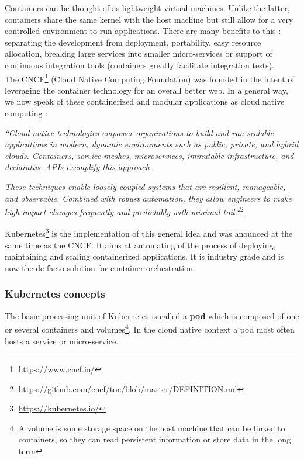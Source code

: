 \documentclass[12pt, a4paper]{memoir}
\begin{document}
Containers can be thought of as lightweight virtual machines. Unlike the
latter, containers share the same kernel with the host machine but still allow
for a very controlled environment to run applications. There are many
benefits to this : separating the development from deployment, portability,
easy resource allocation, breaking large services into smaller micro-services
or support of continuous integration tools (containers greatly facilitate
integration tests).\\

The CNCF\footnote{\url{https://www.cncf.io/}} (Cloud Native Computing
Foundation) was founded in the intent of leveraging the container technology
for an overall better web. In a general way, we now speak of these
containerized and modular applications as cloud native computing :

\textit{``Cloud native technologies empower organizations to build and run
	scalable applications in modern, dynamic environments such as public,
	private, and hybrid clouds. Containers, service meshes, microservices,
	immutable infrastructure, and declarative APIs exemplify this
	approach.}

\textit{These techniques enable loosely coupled systems that
	are resilient, manageable, and observable.  Combined with robust
	automation, they allow engineers to make high-impact changes frequently
	and predictably with minimal toil.``}\footnote{\url{https://github.com/cncf/toc/blob/master/DEFINITION.md}}

Kubernetes\footnote{\url{https://kubernetes.io/}} is the implementation of this
general idea and was anounced at the same time as the CNCF. It aims at
automating of the process of deploying, maintaining and scaling containerized
applications. It is industry grade and is now the de-facto solution for
container orchestration.


\subsubsection{Kubernetes concepts}
The basic processing unit of Kubernetes is called a \textbf{pod} which is
composed of one or several containers and volumes\footnote{A volume is some
	storage space on the host machine that can be linked to containers, so
	they can read persistent information or store data in the long term}.
In the cloud native context a pod most often hosts a service or micro-service.
\end{document}
